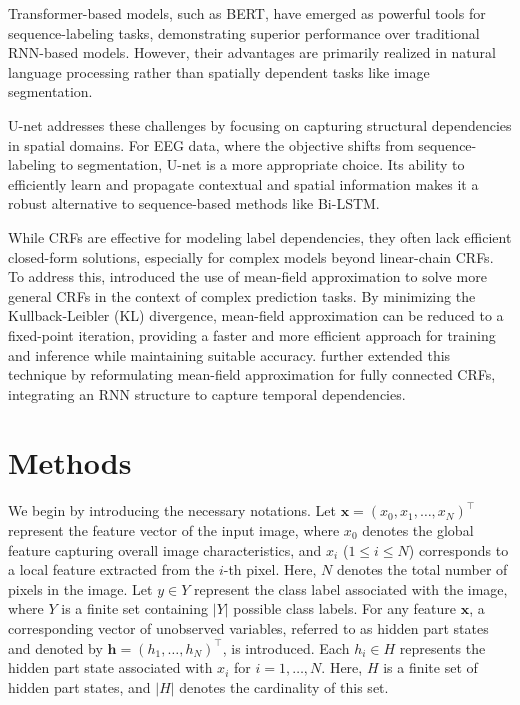 \documentclass[conference]{IEEEtran}
\newcommand{\hb}{\mathbf{h}}
\newcommand{\xb}{\mathbf{x}}
\begin{document}
Transformer-based models, such as BERT, have emerged as powerful tools for
sequence-labeling tasks, demonstrating superior performance over traditional
RNN-based models. However, their advantages are primarily realized in natural
language processing rather than spatially dependent tasks like image
segmentation.


U-net addresses these challenges by focusing on capturing structural
dependencies in spatial domains. For EEG data, where the objective shifts from
sequence-labeling to segmentation, U-net is a more appropriate choice. Its
ability to efficiently learn and propagate contextual and spatial information
makes it a robust alternative to sequence-based methods like Bi-LSTM.


While CRFs are effective for modeling label dependencies, they often lack
efficient closed-form solutions, especially for complex models beyond
linear-chain CRFs. To address this, \citet{krahenbuhl2011efficient} introduced
the use of mean-field approximation to solve more general CRFs in the context
of complex prediction tasks. By minimizing the Kullback-Leibler (KL)
divergence, mean-field approximation can be reduced to a fixed-point iteration,
providing a faster and more efficient approach for training and inference
while maintaining suitable accuracy. \citet{zheng2015conditional} further
extended this technique by reformulating mean-field approximation for fully
connected CRFs, integrating an RNN structure to capture temporal dependencies.


\section{Methods}


We begin by introducing the necessary notations.
Let $\xb = (x_0, x_1, \dots, x_N)^\top$ represent the feature vector of the
input image, where $x_0$ denotes the global feature capturing overall image
characteristics, and $x_i$ ($1 \leq i \leq N$) corresponds to a local feature
extracted from the $i$-th pixel. Here, $N$ denotes the total number of pixels
in the image. Let $y \in Y$ represent the class label associated with the image,
where $Y$ is a finite set containing $\vert Y \vert$ possible class labels.
For any feature $\xb$, a corresponding vector of unobserved variables, referred
to as hidden part states and denoted by $\hb = (h_1, \dots, h_N)^\top$,
is introduced. Each $h_i \in H$ represents the hidden part state associated
with $x_i$ for $i = 1, \dots, N$. Here, $H$ is a finite set of hidden part
states, and $\vert H \vert$ denotes the cardinality of this set.
\end{document}
